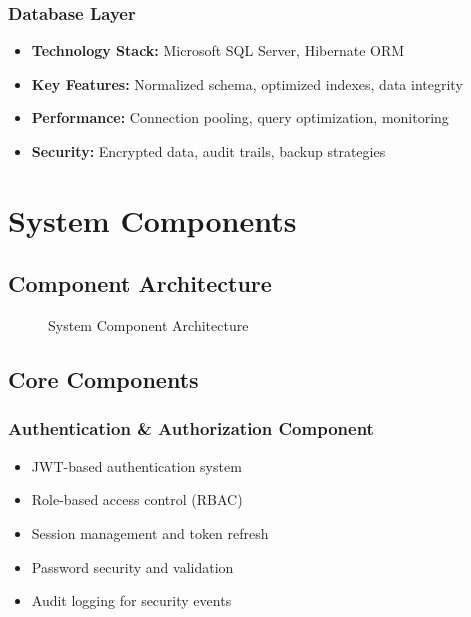 \documentclass[12pt,a4paper]{article}
\begin{document}
\subsubsection{Database Layer}
\begin{itemize}
    \item \textbf{Technology Stack:} Microsoft SQL Server, Hibernate ORM
    \item \textbf{Key Features:} Normalized schema, optimized indexes, data integrity
    \item \textbf{Performance:} Connection pooling, query optimization, monitoring
    \item \textbf{Security:} Encrypted data, audit trails, backup strategies
\end{itemize}

\section{System Components}

\subsection{Component Architecture}

\begin{figure}[H]
\centering
{}
\caption{System Component Architecture}
\label{fig:component-architecture}
\end{figure}

\subsection{Core Components}

\subsubsection{Authentication & Authorization Component}
\begin{itemize}
    \item JWT-based authentication system
    \item Role-based access control (RBAC)
    \item Session management and token refresh
    \item Password security and validation
    \item Audit logging for security events
\end{itemize}
\end{document}
